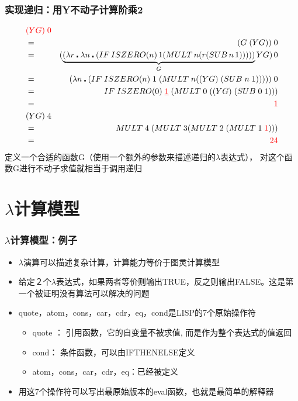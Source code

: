 \documentclass[CJKutf8,compress,hyperref]{beamer}
\begin{document}
\begin{CJK}{UTF8}{song}
\begin{frame}
  \frametitle{实现递归：用Y不动子计算阶乘2} 
  \begin{eqnarray*} 
    & {\color{red}(YG) \; 0} &    \\
    & =  & (G \; (YG)) \; 0 \\  
    & = & (\underbrace{(\lambda r \centerdot \lambda n \centerdot  (IF \, ISZERO(n) \, 1 (MULT \, n (r (SUB \, n \,1)))))}_G YG) \, 0 \\
    & =  & (\lambda n \centerdot (IF \; ISZERO(n) \; 1 \; (MULT \; n ((YG) \; (SUB \; n \; 1))))) \;0 \\
    & = & IF \; ISZERO(0) \; {\color{red}\underline{1}} \; (MULT \; 0 \; ((YG) \; (SUB \;0 \;1))) \\ 
    & =  & {\color{red}1} \\
    & (YG) \; 4 &  \\ 
    & = &  MULT \; 4 \; (MULT \; 3 (MULT \; 2 \; (MULT \; 1 \; {\color{red}1}))) \\ 
    & =  & {\color{red}24}
  \end{eqnarray*} 
  {\color{red}定义一个合适的函数G（使用一个额外的参数来描述递归的$\lambda$表达式）， 对这个函数G进行不动子求值就相当于调用递归}
\end{frame}

\section{$\lambda$计算模型}

\begin{frame}
  \frametitle{$\lambda$计算模型：例子} 
  \begin{itemize}
  \item $\lambda$演算可以描述复杂计算，计算能力等价于图灵计算模型 
  \item 给定２个$\lambda$表达式，如果两者等价则输出TRUE，反之则输出FALSE。这是第一个被证明{\color{red}没有算法可以解决}的问题
  \item quote，atom，cons，car，cdr，eq，cond是LISP的7个原始操作符 
    \begin{itemize}
    \item quote ： 引用函数，它的自变量不被求值, 而是作为整个表达式的值返回
    \item cond： 条件函数，可以由IFTHENELSE定义
    \item atom，cons，car，cdr，eq：已经被定义
    \end{itemize}
  \item 用这7个操作符可以写出最原始版本的eval函数，也就是最简单的{\color{red}解释器}\cite{RootsOfLisp}
  \end{itemize}
\end{frame} 


\end{CJK}
\end{document}
